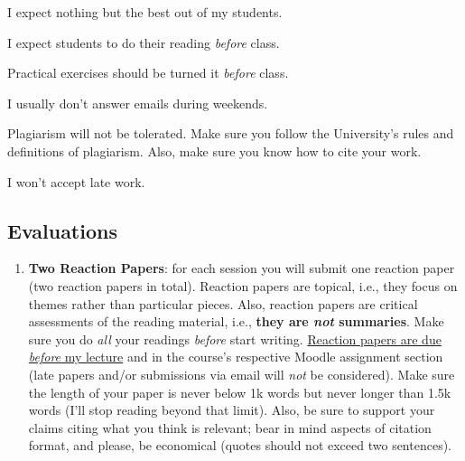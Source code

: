 \documentclass[letterpaper]{article}
\renewenvironment{itemize}{
  \begin{list}{}{
    \setlength{\leftmargin}{1.5em}
  }
}{
  \end{list}
}
\begin{document}
I expect nothing but the best out of my students. 

\begin{itemize}
     \item[$\circ$] I expect students to do their reading \emph{before} class.
     \item[$\circ$] Practical exercises should be turned it \emph{before} class. 

  \item[$\circ$] I usually don't answer emails during weekends. 
\end{itemize}


\begin{itemize}
  \item[{\color{red}\Pointinghand}] Plagiarism will not be tolerated. Make sure you follow the University's rules and definitions of plagiarism. Also, make sure you know how to cite your work. 

  \item[{\color{red}\Pointinghand}] I won't accept late work.

\end{itemize}

\subsection*{Evaluations}

\begin{enumerate}
  \item {\bf Two Reaction Papers}: for each session you will submit one reaction paper (two reaction papers in total). Reaction papers are topical, i.e., they focus on themes rather than particular pieces. Also, reaction papers are critical assessments of the reading material, i.e., {\bf they are \emph{not} summaries}. Make sure you do \emph{all} your readings \emph{before} start writing. \underline{Reaction papers are due \emph{before} my lecture} and in the course's respective Moodle assignment section (late papers and/or submissions via email will \emph{not} be considered). Make sure the length of your paper is never below 1k words but never longer than 1.5k words (I'll stop reading beyond that limit). Also, be sure to support your claims citing what you think is relevant; bear in mind aspects of citation format, and please, be economical (quotes should not exceed two sentences).
\end{enumerate}
\end{document}
